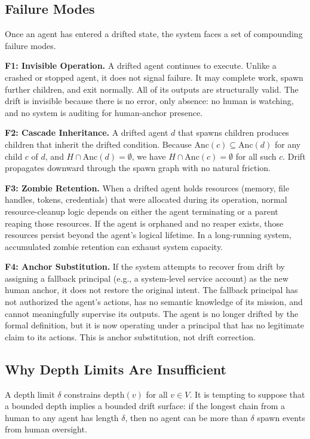 \subsection{Failure Modes}

Once an agent has entered a drifted state, the system faces a set of compounding failure modes.

\textbf{F1: Invisible Operation.}
A drifted agent continues to execute. Unlike a crashed or stopped agent, it does not signal failure. It may complete work, spawn further children, and exit normally. All of its outputs are structurally valid. The drift is invisible because there is no error, only absence: no human is watching, and no system is auditing for human-anchor presence.

\textbf{F2: Cascade Inheritance.}
A drifted agent $d$ that spawns children produces children that inherit the drifted condition. Because $\mathrm{Anc}(c) \subseteq \mathrm{Anc}(d)$ for any child $c$ of $d$, and $H \cap \mathrm{Anc}(d) = \emptyset$, we have $H \cap \mathrm{Anc}(c) = \emptyset$ for all such $c$. Drift propagates downward through the spawn graph with no natural friction.

\textbf{F3: Zombie Retention.}
When a drifted agent holds resources (memory, file handles, tokens, credentials) that were allocated during its operation, normal resource-cleanup logic depends on either the agent terminating or a parent reaping those resources. If the agent is orphaned and no reaper exists, those resources persist beyond the agent's logical lifetime. In a long-running system, accumulated zombie retention can exhaust system capacity.

\textbf{F4: Anchor Substitution.}
If the system attempts to recover from drift by assigning a fallback principal (e.g., a system-level service account) as the new human anchor, it does not restore the original intent. The fallback principal has not authorized the agent's actions, has no semantic knowledge of its mission, and cannot meaningfully supervise its outputs. The agent is no longer drifted by the formal definition, but it is now operating under a principal that has no legitimate claim to its actions. This is anchor substitution, not drift correction.

\subsection{Why Depth Limits Are Insufficient}

A depth limit $\delta$ constrains $\mathrm{depth}(v)$ for all $v \in V$. It is tempting to suppose that a bounded depth implies a bounded drift surface: if the longest chain from a human to any agent has length $\delta$, then no agent can be more than $\delta$ spawn events from human oversight.

